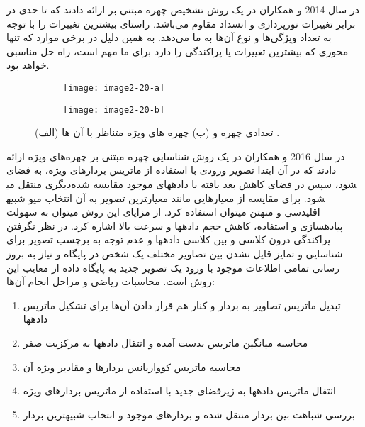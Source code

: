 \noindent
در سال 2014  و همکاران در \cite{LUAN2014495} یک روش تشخیص چهره مبتنی بر  ارائه دادند که تا حدی در برابر تغییرات نورپردازی و انسداد مقاوم می‌باشد.  راستای بیشترین تغییرات را با توجه به تعداد ویژگی‌ها و نوع آن‌ها به ما می‌دهد. به همین دلیل در برخی موارد که تنها محوری که بیشترین تغییرات یا پراکندگی را دارد برای ما مهم است، راه حل مناسبی خواهد بود. 

\begin{figure}
\begin{subfigure}{.5\textwidth}
  \centering
  \texttt{[image: image2-20-a]}
  \label{image2-20-a}
\end{subfigure}
\begin{subfigure}{.5\textwidth}
  \centering
  \texttt{[image: image2-20-b]}
  \label{image2-20-b}
\end{subfigure}
  \caption{ (الف) تعدادی چهره و (ب) چهره های ویژه متناظر با آن ها \cite{ref1}.}
\label{fig:image2-20}
\end{figure}

\noindent
در سال 2016  و همکاران در \cite{7854053} یک روش شناسایی چهره مبتنی بر چهره‌های ویژه ارائه دادند که در آن ابتدا تصویر ورودی با استفاده از ماتریس بردارهای ویژه، به فضای دیگری منتقل می‎شود، سپس در فضای کاهش بعد یافته با داده‏های موجود مقایسه شده و شبیه‎ترین تصویر به آن انتخاب می‎شود. برای مقایسه از معیارهایی مانند معیار اقلیدسی و منهتن می‏توان استفاده کرد. از مزایای این روش می‏توان به سهولت پیاده‏سازی و استفاده، کاهش حجم داده‏ها و سرعت بالا اشاره کرد. در نظر نگرفتن پراکندگی درون کلاسی و بین کلاسی داده‏ها و عدم توجه به برچسب تصویر برای شناسایی و تمایز قایل نشدن بین تصاویر مختلف یک شخص در پایگاه و نیاز به بروز رسانی تمامی اطلاعات موجود با ورود یک تصویر جدید به پایگاه داده از معایب این روش است. 
محاسبات ریاضی و مراحل انجام آن‌ها:
\begin{enumerate}
\item
	تبدیل ماتریس تصاویر به بردار و کنار هم قرار دادن آن‌ها برای تشکیل ماتریس داده‏ها
\item 
	محاسبه‏ میانگین ماتریس بدست آمده و انتقال داده‏ها به مرکزیت صفر
\item
محاسبه‏ ماتریس کوواریانس بردارها و مقادیر ویژه‏ آن
\item
انتقال ماتریس داده‏ها به زیرفضای جدید با استفاده از ماتریس بردارهای ویژه
\item
	بررسی شباهت بین بردار منتقل شده و بردارهای موجود و انتخاب شبیه‏ترین بردار
\end{enumerate}

